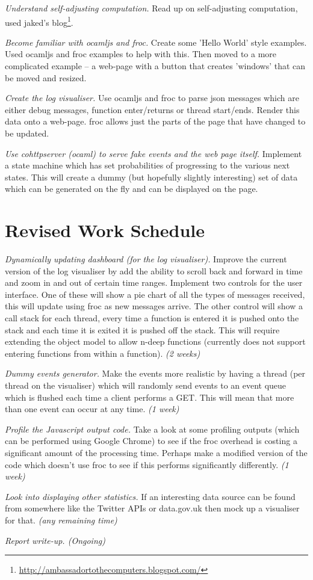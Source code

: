 \documentclass[10pt,a4paper]{article}
\begin{document}
\emph{Understand self-adjusting computation.} Read up on self-adjusting computation, used jaked's blog\footnote{\url{http://ambassadortothecomputers.blogspot.com/}}.

\emph{Become familiar with ocamljs and froc.} Create some 'Hello World' style examples. Used ocamljs and froc examples to help with this. Then moved to a more complicated example -- a web-page with a button that creates 'windows' that can be moved and resized.

\emph{Create the log visualiser.} Use ocamljs and froc to parse json messages which are either debug messages, function enter/returns or thread start/ends. Render this data onto a web-page. froc allows just the parts of the page that have changed to be updated.

\emph{Use cohttpserver (ocaml) to serve fake events and the web page itself.} Implement a state machine which has set probabilities of progressing to the various next states. This will create a dummy (but hopefully slightly interesting) set of data which can be generated on the fly and can be displayed on the page.

\section{Revised Work Schedule}
\emph{Dynamically updating dashboard (for the log visualiser).} Improve the current version of the log visualiser by add the ability to scroll back and forward in time and zoom in and out of certain time ranges. Implement two controls for the user interface. One of these will show a pie chart of all the types of messages received, this will update using froc as new messages arrive. The other control will show a call stack for each thread, every time a function is entered it is pushed onto the stack and each time it is exited it is pushed off the stack. This will require extending the object model to allow n-deep functions (currently does not support entering functions from within a function). \emph{(2 weeks)}

\emph{Dummy events generator.} Make the events more realistic by having a thread (per thread on the visualiser) which will randomly send events to an event queue which is flushed each time a client performs a GET. This will mean that more than one event can occur at any time. \emph{(1 week)}

\emph{Profile the Javascript output code.} Take a look at some profiling outputs (which can be performed using Google Chrome) to see if the froc overhead is costing a significant amount of the processing time. Perhaps make a modified version of the code which doesn't use froc to see if this performs significantly differently. \emph{(1 week)}

\emph{Look into displaying other statistics.} If an interesting data source can be found from somewhere like the Twitter APIs or data.gov.uk then mock up a visualiser for that. \emph{(any remaining time)}

\emph{Report write-up. (Ongoing)}
\end{document}
